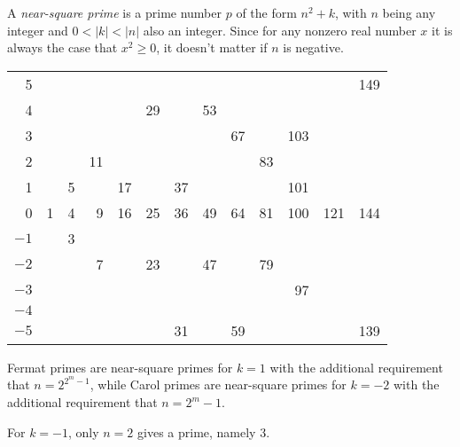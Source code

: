 \documentclass[12pt]{article}
\begin{document}
A {\em near-square prime} is a prime number $p$ of the form $n^2 + k$, with $n$ being any integer and $0 < |k| < |n|$ also an integer. Since for any nonzero real number $x$ it is always the case that $x^2 \geq 0$, it doesn't matter if $n$ is negative.

\begin{tabular}{|r|r|r|r|r|r|r|r|r|r|r|r|r|}
   5  &    &    &     &     &    &    &    &    &    &      &     & 149 \\
   4  &    &    &     &     & 29 &    & 53 &    &    &      &     &     \\
   3  &    &    &     &     &    &    &    & 67 &    &  103 &     &     \\
   2  &    &    &  11 &     &    &    &    &    & 83 &      &     &     \\
   1  &    &  5 &     &  17 &    & 37 &    &    &    &  101 &     &     \\
   0  &  1 &  4 &   9 &  16 & 25 & 36 & 49 & 64 & 81 &  100 & 121 & 144 \\
 $-1$ &    &  3 &     &     &    &    &    &    &    &      &     &     \\
 $-2$ &    &    &   7 &     & 23 &    & 47 &    & 79 &      &     &     \\
 $-3$ &    &    &     &     &    &    &    &    &    &   97 &     &     \\
 $-4$ &    &    &     &     &    &    &    &    &    &      &     &     \\
 $-5$ &    &    &     &     &    & 31 &    & 59 &    &      &     & 139 \\
\end{tabular}

Fermat primes are near-square primes for $k = 1$ with the additional requirement that $n = 2^{2^m - 1}$, while Carol primes are near-square primes for $k = -2$ with the additional requirement that $n = 2^m - 1$.

For $k = -1$, only $n = 2$ gives a prime, namely 3.
\end{document}
